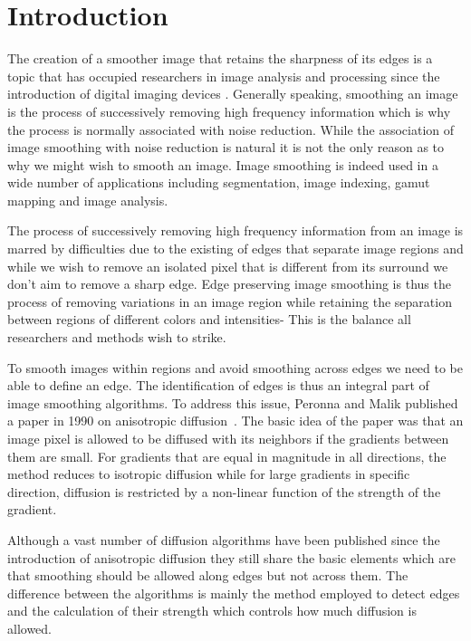 \section{Introduction}
The creation of a smoother image that retains the sharpness of its edges is a topic that has occupied researchers in image analysis and processing since the introduction of digital imaging devices%
\cite{AlsamFarup11,Rudin:1992:NTV:142273.142312,AlsamRivertz11,Perona90scale-spaceand,Blomgren96colortv,Tschumperl-vector-valuedimage}.
Generally speaking, smoothing an image is the process of successively removing high frequency information which is why the process is normally associated with noise reduction. While the association of image smoothing with noise reduction is natural it is not the only reason as to why we might wish to smooth an image. Image smoothing is indeed used in a wide number of applications including segmentation, image indexing, gamut mapping and image analysis.

The process of successively removing high frequency information from an image is marred by difficulties due to the existing of edges that separate image regions and while we wish to remove an isolated pixel that is different from its surround we don't aim to remove a sharp edge. Edge preserving image smoothing is thus the process of removing variations in an image region while retaining the separation between regions of different colors and intensities- This is the balance all researchers and methods wish to strike.

To smooth images within regions and avoid smoothing across edges we need to be able to define an edge. The identification of edges is thus an integral part of image smoothing algorithms. To address this issue, Peronna and Malik published a paper in 1990 on anisotropic diffusion~\cite{Perona90scale-spaceand}. The basic idea of the paper was that an image pixel is allowed to be diffused with its neighbors if the gradients between them are small. For gradients that are equal in magnitude in all directions, the method reduces to isotropic diffusion while for large gradients in specific direction, diffusion is restricted by a non-linear function of the strength of the gradient.

Although a vast number of diffusion algorithms have been published since the introduction of anisotropic diffusion they still share the basic elements which are that smoothing should be allowed along edges but not across them. The difference between the algorithms is mainly the method employed to detect edges and the calculation of their strength which controls how much diffusion is allowed.


